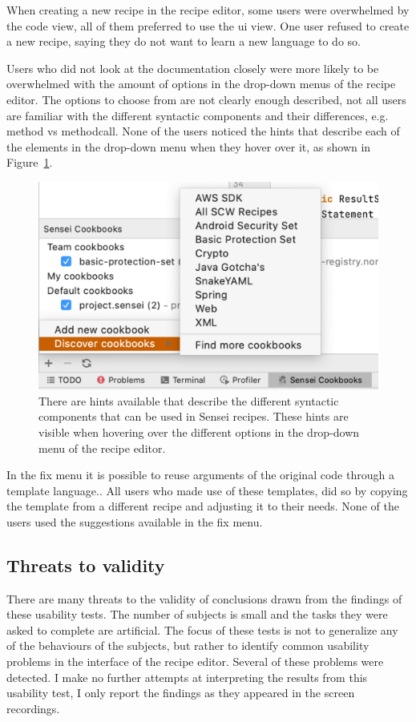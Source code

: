 When creating a new recipe in the recipe editor, some users were overwhelmed by the code view, all of them preferred to use the \gls{ui} view.
One user refused to create a new recipe, saying they do not want to learn a new language to do so.

Users who did not look at the documentation closely were more likely to be overwhelmed with the amount of options in the drop-down menus of the recipe editor.
The options to choose from are not clearly enough described, not all users are familiar with the different syntactic components and their differences, e.g. method vs methodcall.
None of the users noticed the hints that describe each of the elements in the drop-down menu when they hover over it, as shown in Figure~\ref{fig:dropdownhint}.

\begin{figure}
  \centering
  \includegraphics[width=\textwidth,page=6]{04-tools/figures/figures1.pdf}
  \caption[Hints for different syntactic components in the recipe editor]{There are hints available that describe the different syntactic components that can be used in Sensei recipes. These hints are visible when hovering over the different options in the drop-down menu of the recipe editor.}
  \label{fig:dropdownhint} 
\end{figure}

In the fix menu it is possible to reuse arguments of the original code through a template language..
All users who made use of these templates, did so by copying the template from a different recipe and adjusting it to their needs.
None of the users used the suggestions available in the fix menu.

\subsection{Threats to validity}
There are many threats to the validity of conclusions drawn from the findings of these usability tests.
The number of subjects is small and the tasks they were asked to complete are artificial.
The focus of these tests is not to generalize any of the behaviours of the subjects, but rather to identify common usability problems in the interface of the recipe editor.
Several of these problems were detected.
I make no further attempts at interpreting the results from this usability test, I only report the findings as they appeared in the screen recordings.